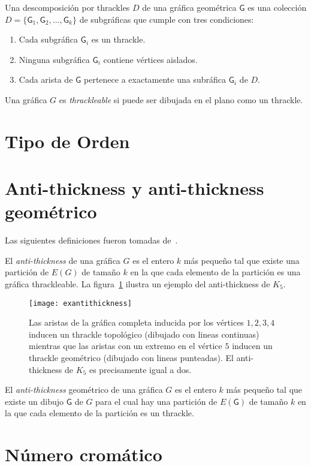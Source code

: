 Una descomposición por thrackles $D$ de una gráfica geométrica
$\mathsf{G}$ es una colección $D=\{\mathsf{G}_1,\mathsf{G}_2,\dots,\mathsf{G}_k\}$
de subgráficas que cumple con tres condiciones:
\begin{enumerate}
  \item Cada subgráfica $\mathsf{G}_i$ es un thrackle.
  \item Ninguna subgráfica $\mathsf{G}_i$ contiene vértices aislados.
  \item Cada arista de $\mathsf{G}$ pertenece a exactamente una subráfica $\mathsf{G}_i$ de $D$.
\end{enumerate}

Una gráfica $G$ es \emph{thrackleable} si puede ser dibujada en el plano como un thrackle.
\section{Tipo de Orden}
\section{Anti-thickness y anti-thickness geométrico}
Las siguientes definiciones fueron tomadas de~\cite{Dujmovic2017}.

El \emph{anti-thickness} de una gráfica $G$ es el entero $k$ más pequeño tal que existe una
partición de $E(G)$ de tamaño $k$ en la que cada elemento de la partición
es una gráfica thrackleable. La figura~\ref{fig:exantithickness} ilustra un ejemplo del
anti-thickness de $K_5$.
\begin{figure}
  \centering
  \texttt{[image: exantithickness]}
  \caption{Las aristas de la gráfica completa inducida por los vértices $1,2,3,4$
  inducen un thrackle topológico (dibujado con lineas continuas)
  mientras que las aristas con un extremo en el vértice $5$ inducen un thrackle geométrico
  (dibujado con lineas punteadas).
  El anti-thickness de $K_5$ es precisamente igual a dos.}
  \label{fig:exantithickness}
\end{figure}

El \emph{anti-thickness} geométrico de una gráfica $G$ es el entero $k$ más pequeño tal que existe un
dibujo $\mathsf{G}$ de $G$ para el cual hay una partición de $E(\mathsf{G})$ de tamaño $k$
en la que cada elemento de la partición es un thrackle.
\section{Número cromático}
